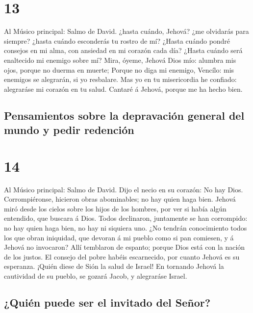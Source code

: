 \hypertarget{section-12}{%
\section{13}\label{section-12}}

 Al Músico principal: Salmo de David. ¿hasta cuándo,
Jehová? ¿me olvidarás para siempre? ¿hasta cuándo esconderás tu rostro
de mí?  ¿Hasta cuándo pondré consejos en mi alma, con
ansiedad en mi corazón cada día? ¿Hasta cuándo será enaltecido mi
enemigo sobre mí?  Mira, óyeme, Jehová Dios mío: alumbra
mis ojos, porque no duerma en muerte;  Porque no diga mi
enemigo, Vencílo: mis enemigos se alegrarán, si yo resbalare.
 Mas yo en tu misericordia he confiado: alegraráse mi
corazón en tu salud.  Cantaré á Jehová, porque me ha hecho
bien.

\hypertarget{pensamientos-sobre-la-depravaciuxf3n-general-del-mundo-y-pedir-redenciuxf3n}{%
\subsection{Pensamientos sobre la depravación general del mundo y pedir
redención}\label{pensamientos-sobre-la-depravaciuxf3n-general-del-mundo-y-pedir-redenciuxf3n}}

\hypertarget{section-13}{%
\section{14}\label{section-13}}

 Al Músico principal: Salmo de David. Dijo el necio en su
corazón: No hay Dios. Corrompiéronse, hicieron obras abominables; no hay
quien haga bien.  Jehová miró desde los cielos sobre los
hijos de los hombres, por ver si había algún entendido, que buscara á
Dios.  Todos declinaron, juntamente se han corrompido: no
hay quien haga bien, no hay ni siquiera uno.  ¿No tendrán
conocimiento todos los que obran iniquidad, que devoran á mi pueblo como
si pan comiesen, y á Jehová no invocaron?  Allí temblaron
de espanto; porque Dios está con la nación de los justos. 
El consejo del pobre habéis escarnecido, por cuanto Jehová es su
esperanza.  ¡Quién diese de Sión la salud de Israel! En
tornando Jehová la cautividad de su pueblo, se gozará Jacob, y
alegraráse Israel.

\hypertarget{quiuxe9n-puede-ser-el-invitado-del-seuxf1or}{%
\subsection{¿Quién puede ser el invitado del
Señor?}\label{quiuxe9n-puede-ser-el-invitado-del-seuxf1or}}

